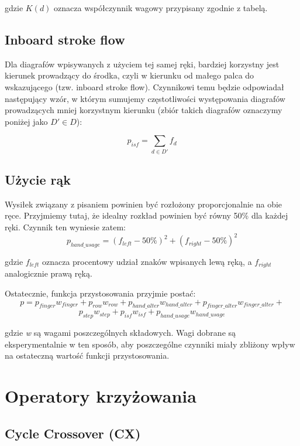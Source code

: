 \documentclass[brudnopis]{xmgr}
\begin{document}
gdzie $K(d)$ oznacza współczynnik wagowy przypisany zgodnie z tabelą.


\subsection{Inboard stroke flow}

Dla diagrafów wpisywanych z użyciem tej samej ręki, bardziej korzystny jest kierunek prowadzący do środka, czyli w kierunku od małego palca do wskazującego (tzw. inboard stroke flow). Czynnikowi temu będzie odpowiadał następujący wzór, w którym sumujemy częstotliwości występowania diagrafów prowadzących mniej korzystnym kierunku (zbiór takich diagrafów oznaczymy poniżej jako $ D' \in D $):

$$ p_{isf} = \sum\limits_{d \in D'} f_d $$


\subsection{Użycie rąk}

Wysiłek związany z pisaniem powinien być rozłożony proporcjonalnie na obie ręce. Przyjmiemy tutaj, że idealny rozkład powinien być równy 50\% dla każdej ręki. Czynnik ten wyniesie zatem:
$$ p_{hand\_usage} = (f_{left} - 50\%)^2 + (f_{right} - 50\%)^2 $$

gdzie $f_{left}$ oznacza procentowy udział znaków wpisanych lewą ręką, a $f_{right}$ analogicznie prawą ręką.\newline\newline


\noindent Ostatecznie, funkcja przystosowania przyjmie postać:
$$ p = p_{finger} w_{finger} + p_{row} w_{row} + p_{hand\_alter} w_{hand\_alter} + p_{finger\_alter} w_{finger\_alter} + $$
$$ p_{step} w_{step} + p_{isf} w_{isf} + p_{hand\_usage} w_{hand\_usage} $$

\noindent
gdzie \emph{w} są wagami poszczególnych składowych. Wagi dobrane są eksperymentalnie w ten sposób, aby poszczególne czynniki miały zbliżony wpływ na ostateczną wartość funkcji przystosowania.


\section{Operatory krzyżowania}

\subsection{Cycle Crossover (CX)}
\end{document}
